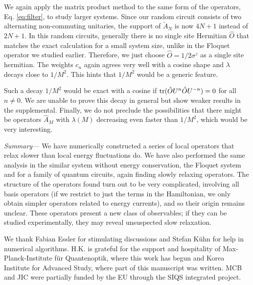 \documentclass[twocolumn,superscriptaddress, prb]{revtex4-1}
\begin{document}
We again apply the matrix product method to the same form of the operators, Eq. \eqref{eq:filter},
to study larger systems. Since our random circuit consists of two alternating non-commuting unitaries,
the support of $\tilde{A}_N$ is now $4N+1$ instead of $2N+1$.
In this random circuits, generally there is no single site Hermitian $\hat{O}$
that matches the exact calculation for a small system size, unlike in the Floquet operator we studied earlier.
Therefore, we just choose $\hat{O} = 1/2\sigma^z$ as a single site hermitian.
The weights $c_n$ again agrees very well with a cosine shape and $\lambda$ decays close to $1/M^2$.
This hints that $1/M^2$ would be a generic feature.

Such a decay $1/M^2$ would be exact with a cosine if
${\rm tr}(\hat{O} U^n \hat{O} U^{- n})=0$ for all $n \neq 0$.
We are unable to prove this decay in general but show weaker results in the supplemental.
Finally, we do not preclude the possibilities that
there might be operators $\hat{A}_M$ with $\lambda(M)$ decreasing even faster than $1/M^2$,
which would be very interesting.


{\it Summary---}
We have numerically constructed a series of local operators that relax slower than local energy fluctuations do.
We have also performed the same analysis in the similar system without energy conservation,
the Floquet system and for a family of quantum circuits, again finding slowly relaxing operators.
The structure of the operators found turn out to be very complicated, involving all basis operators
(if we restrict to just the terms in the Hamiltonian, we only obtain simpler operators related to energy currents),
and so their origin remains unclear.
These operators present a new class of observables; if they can be studied experimentally, they may reveal unsuspected slow relaxation.

We thank Fabian Essler for stimulating discussions and Stefan K\"{u}hn for help in numerical algorithms.
H.K. is grateful for the support and hospitality of Max-Planck-Institute f\"{u}r Quantenoptik,
where this work has begun and Korea Institute for Advanced Study, where part of this manuscript was written.
MCB and JIC were partially funded by the EU through the SIQS integrated project.
\end{document}
